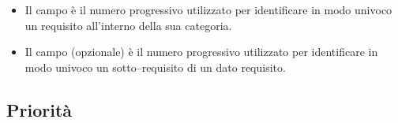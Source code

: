 \begin{itemize}
	\item Il campo  è il numero progressivo utilizzato per identificare in modo univoco un requisito all'interno della sua categoria.

	\item Il campo  (opzionale) è il numero progressivo utilizzato per identificare in modo univoco un sotto--requisito di un dato requisito.
\end{itemize}

\subsection{Priorità}
\label{cha:priorita}
